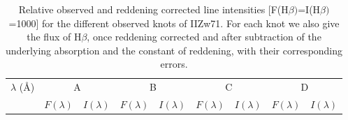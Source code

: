 \documentclass[structabstract]{aa}
\begin{document}


\begin{table}
\begin{minipage}{170mm}
\caption{Relative observed and reddening corrected line intensities
  [F(H$\beta)$=I(H$\beta)$=1000] for the different observed knots of IIZw71. For each knot we also give the flux of H$\beta$, once reddening corrected and after subtraction of the underlying absorption and the constant of reddening, with their corresponding errors.} 
\label{lineas}
\begin{center}
\begin{tabular}{lcccccccc}
\hline
                           

\multicolumn{1}{c}{$\lambda$  ({\AA})}  & \multicolumn{2}{c}{A} & \multicolumn{2}{c}{B}  & \multicolumn{2}{c}{C} & \multicolumn{2}{c}{D} \\
 & $F(\lambda)$  &  $I(\lambda)$ &  $F(\lambda)$  & $I(\lambda)$ &  $F(\lambda)$  &  $I(\lambda)$ &  $F(\lambda)$  & $I(\lambda)$ \\
\hline


\end{tabular}
\end{center}
\end{minipage}
\end{table}
\end{document}
